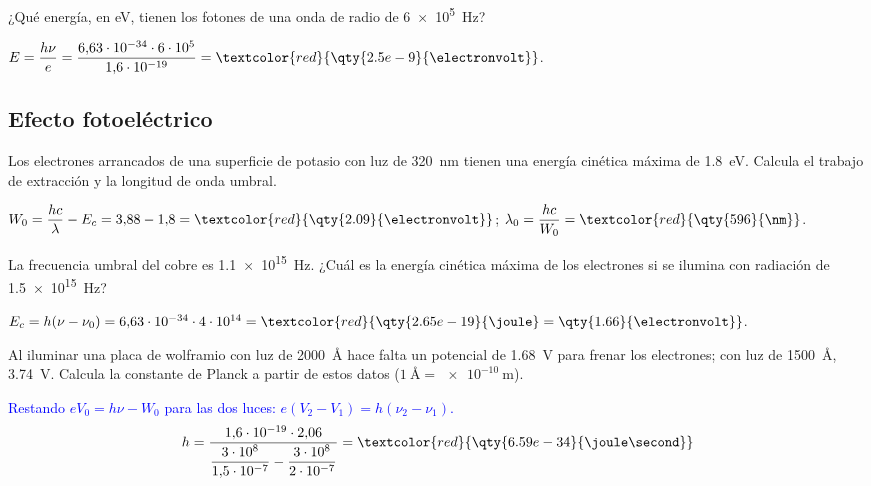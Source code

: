 \begin{exercise}
    ¿Qué energía, en eV, tienen los fotones de una onda de radio de \qty{6e5}{\hertz}?
    \begin{solu}
        \(E = \dfrac{h\nu}{e} = \dfrac{6{,}63\cdot 10^{-34}\cdot 6\cdot 10^5}{1{,}6\cdot 10^{-19}} = \textcolor{red}{\qty{2.5e-9}{\electronvolt}}\).
    \end{solu}
\end{exercise}

\subsection{Efecto fotoeléctrico}

\begin{exercise}
    Los electrones arrancados de una superficie de potasio con luz de \qty{320}{\nm} tienen una energía cinética máxima de
    \qty{1.8}{\electronvolt}. Calcula el trabajo de extracción y la longitud de onda umbral.
    \begin{solu}
        \(W_0 = \dfrac{hc}{\lambda} - E_c = 3{,}88 - 1{,}8 = \textcolor{red}{\qty{2.09}{\electronvolt}}\);
        \(\lambda_0 = \dfrac{hc}{W_0} = \textcolor{red}{\qty{596}{\nm}}\).
    \end{solu}
\end{exercise}

\begin{exercise}
    La frecuencia umbral del cobre es \qty{1.1e15}{\hertz}. ¿Cuál es la energía cinética máxima de los electrones si se ilumina con
    radiación de \qty{1.5e15}{\hertz}?
    \begin{solu}
        \(E_c = h(\nu - \nu_0) = 6{,}63\cdot 10^{-34}\cdot 4\cdot 10^{14} = \textcolor{red}{\qty{2.65e-19}{\joule} = \qty{1.66}{\electronvolt}}\).
    \end{solu}
\end{exercise}

\begin{exercise}
    Al iluminar una placa de wolframio con luz de \qty{2000}{\angstrom} hace falta un potencial de \qty{1.68}{\volt} para frenar los electrones;
    con luz de \qty{1500}{\angstrom}, \qty{3.74}{\volt}. Calcula la constante de Planck a partir de estos datos (\(\qty{1}{\angstrom} = \qty{e-10}{\m}\)).
    \begin{solu}
        \textcolor{blue}{Restando \(eV_0 = h\nu - W_0\) para las dos luces: \(e(V_2 - V_1) = h(\nu_2 - \nu_1)\).}
        \[ h = \dfrac{1{,}6\cdot 10^{-19}\cdot 2{,}06}{\dfrac{3\cdot 10^8}{1{,}5\cdot 10^{-7}} - \dfrac{3\cdot 10^8}{2\cdot 10^{-7}}} = \textcolor{red}{\qty{6.59e-34}{\joule\second}} \]
    \end{solu}
\end{exercise}

